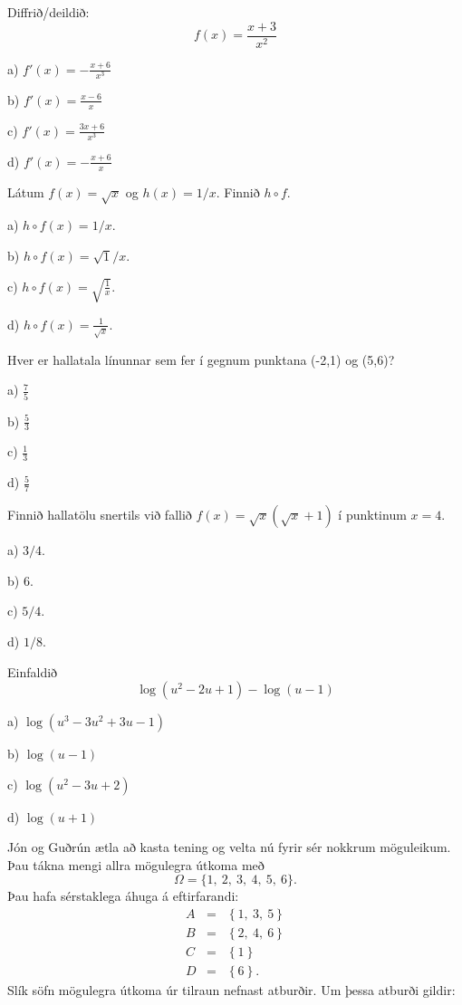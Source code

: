 \item Diffrið/deildið: $$f(x)=\frac{x+3}{x^2}$$

a) \hspace{2mm} $\displaystyle f'(x)=-\frac{x+6}{x^3}$ %

b) \hspace{2mm} $\displaystyle f'(x)=\frac{x-6}{x}$

c) \hspace{2mm} $\displaystyle f'(x)=\frac{3x+6}{x^3}$

d) \hspace{2mm} $\displaystyle f'(x)=-\frac{x+6}{x}$


\item Látum $f(x)=\sqrt x$ og $h(x)=1/x$. Finnið $h\circ f$.

a) $h \circ f(x) = 1/x$.

b) $h \circ f(x) = \sqrt{1}/x$.

c) $h \circ f(x) = \sqrt{\frac 1x}$.

d) $h\circ f(x) = \frac{1}{\sqrt x}$. %


\item Hver er hallatala línunnar sem fer í gegnum punktana (-2,1) og (5,6)?

a) \hspace{2mm} $\displaystyle\frac{7}{5}$

b) \hspace{2mm} $\displaystyle\frac{5}{3}$

c) \hspace{2mm} $\displaystyle\frac{1}{3}$

d) \hspace{2mm} $\displaystyle\frac{5}{7}$ %


\item Finnið hallatölu snertils við fallið $f(x) = \sqrt x
\left( \sqrt{x} + 1\right)$ í punktinum $x=4$.

a) $3/4$.

b) $6$.

c) $5/4$. %

d) $1/8$.


\item Einfaldið
$$\log(u^2-2u+1)-\log(u-1)$$

a) $\log(u^3-3u^2+3u-1)$

b) $\log(u-1)$ %

c) $\log(u^2-3u+2)$

d) $\log(u+1)$


\item Jón og Guðrún ætla að kasta tening og velta nú fyrir sér nokkrum möguleikum. Þau tákna mengi
allra mögulegra útkoma með
$$
\Omega=\{1,\ 2,\ 3,\ 4,\ 5,\ 6\}.
$$
Þau hafa sérstaklega áhuga á eftirfarandi:
\begin{eqnarray*}
A&=&\left \{ 1,\ 3,\ 5 \right \} \\
B&=&\left \{ 2,\ 4,\ 6  \right \} \\
C&=&\left \{ 1 \right \} \\
D&=&\left \{ 6 \right \}.
\end{eqnarray*}
Slík söfn mögulegra útkoma úr tilraun nefnast atburðir. Um þessa atburði gildir:

